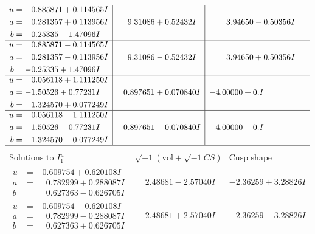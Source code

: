 \documentclass[1p]{elsarticle_modified}
\theoremstyle{definition}
\newcommand{\I}{\sqrt{-1}}
\begin{document}
$$\begin{array}{c|c|c}
\begin{aligned}
u &= \phantom{-}0.885871 + 0.114565 I \\
a &= \phantom{-}0.281357 + 0.113956 I \\
b &= -0.25335 - 1.47096 I\end{aligned}
 & \phantom{-}9.31086 + 0.52432 I & \phantom{-}3.94650 - 0.50356 I \\ \hline\begin{aligned}
u &= \phantom{-}0.885871 - 0.114565 I \\
a &= \phantom{-}0.281357 - 0.113956 I \\
b &= -0.25335 + 1.47096 I\end{aligned}
 & \phantom{-}9.31086 - 0.52432 I & \phantom{-}3.94650 + 0.50356 I \\ \hline\begin{aligned}
u &= \phantom{-}0.056118 + 1.111250 I \\
a &= -1.50526 + 0.77231 I \\
b &= \phantom{-}1.324570 + 0.077249 I\end{aligned}
 & \phantom{-}0.897651 + 0.070840 I & -4.00000 + 0. I\phantom{ +0.000000I} \\ \hline\begin{aligned}
u &= \phantom{-}0.056118 - 1.111250 I \\
a &= -1.50526 - 0.77231 I \\
b &= \phantom{-}1.324570 - 0.077249 I\end{aligned}
 & \phantom{-}0.897651 - 0.070840 I & -4.00000 + 0. I\phantom{ +0.000000I}\\
 \hline 
 \end{array}$$\newpage$$\begin{array}{c|c|c}  
\text{Solutions to }I^u_{1}& \I (\text{vol} + \sqrt{-1}CS) & \text{Cusp shape}\\
 \hline 
\begin{aligned}
u &= -0.609754 + 0.620108 I \\
a &= \phantom{-}0.782999 + 0.288087 I \\
b &= \phantom{-}0.627363 - 0.626705 I\end{aligned}
 & \phantom{-}2.48681 - 2.57040 I & -2.36259 + 3.28826 I \\ \hline\begin{aligned}
u &= -0.609754 - 0.620108 I \\
a &= \phantom{-}0.782999 - 0.288087 I \\
b &= \phantom{-}0.627363 + 0.626705 I\end{aligned}
 & \phantom{-}2.48681 + 2.57040 I & -2.36259 - 3.28826 I \\ \hline\begin{aligned}

\end{aligned}
\end{array}$$
\end{document}

